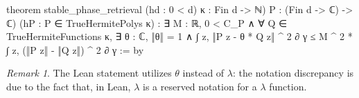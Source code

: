 \documentclass[11pt]{amsart}
\theoremstyle{remark}
\newtheorem{remark}[theorem]{Remark}
\begin{document}
\begin{leancode}
theorem stable_phase_retrieval
    (hd : 0 < d) {κ : Fin d -> ℕ)}
    {P : (Fin d -> ℂ) -> ℂ)} (hP : P ∈ TrueHermitePolys κ) :
    ∃ M : ℝ, 0 < C_P ∧
      ∀ Q ∈ TrueHermiteFunctions κ,
        ∃ θ : ℂ, ‖θ‖ = 1 ∧
          ∫ z, ‖P z - θ * Q z‖ ^ 2 ∂ γ
            ≤ M ^ 2 * ∫ z, (‖P z‖ - ‖Q z‖) ^ 2 ∂ γ := by
\end{leancode}
\begin{remark}
    The Lean statement utilizes $\theta$ instead of $\lambda$: the notation discrepancy is due to the fact that, in Lean, $\lambda$ is a reserved notation for a $\lambda$ function.  
\end{remark}





\end{document}
